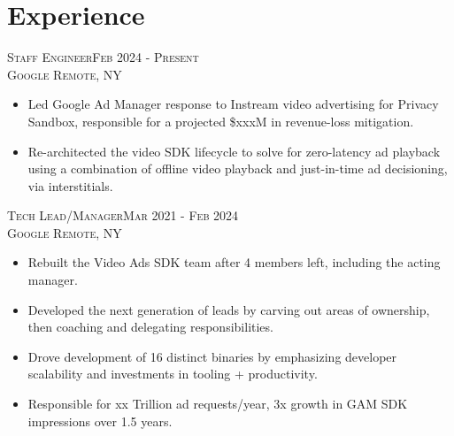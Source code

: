 \section{Experience}
\textsc{Staff Engineer\hfill Feb 2024 - Present\\}
\textsc{Google \hfill Remote, NY\\}
\begin{itemize}
	\setlength{\itemsep}{1pt}
	\setlength{\parskip}{0pt}
	\setlength{\parsep}{0pt}
	\setlength{\leftmargin}{-5mm}
  \item Led Google Ad Manager response to Instream video advertising for Privacy Sandbox, responsible for a projected \$xxxM in revenue-loss mitigation.
  \item Re-architected the video SDK lifecycle to solve for zero-latency ad playback using a combination of offline video playback and just-in-time ad decisioning, via interstitials.
\end{itemize}

\textsc{Tech Lead/Manager\hfill Mar 2021 - Feb 2024\\}
\textsc{Google \hfill Remote, NY\\}
\begin{itemize}
	\setlength{\itemsep}{1pt}
	\setlength{\parskip}{0pt}
	\setlength{\parsep}{0pt}
	\setlength{\leftmargin}{-5mm}
  \item Rebuilt the Video Ads SDK team after 4 members left, including the acting manager.
  \item Developed the next generation of leads by carving out areas of ownership, then coaching and delegating responsibilities.
  \item Drove development of 16 distinct binaries by emphasizing developer scalability and investments in tooling + productivity.
  \item Responsible for xx Trillion ad requests/year, 3x growth in GAM SDK impressions over 1.5 years.
\end{itemize}

